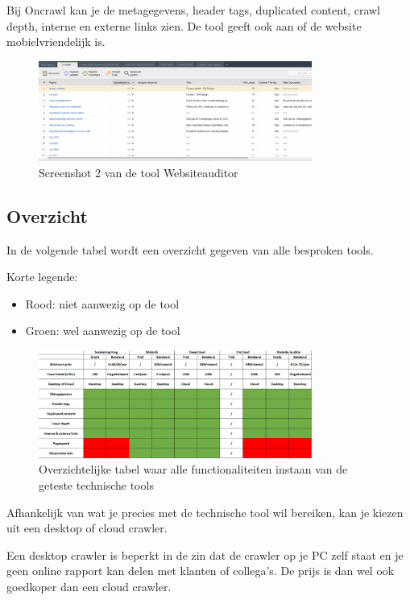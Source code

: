 Bij Oncrawl kan je de metagegevens, header tags, duplicated content, crawl depth, interne en externe links zien. De tool geeft ook aan of de website mobielvriendelijk is.

\begin{figure}[h!]
\centering
\includegraphics[width=0.8\textwidth]{img/websiteauditor1.PNG}
\caption{Screenshot 2 van de tool Websiteauditor
\autocite{websiteauditor}}
\end{figure}

\subsection{Overzicht}
\label{ch: Overzicht}

In de volgende tabel wordt een overzicht gegeven van alle besproken tools. 

Korte legende: 
\begin{itemize}
\item Rood: niet aanwezig op de tool
\item Groen: wel aanwezig op de tool
\end{itemize}

\begin{figure}[h!]
\centering
\includegraphics[width=0.8\textwidth]{img/Knipsel.PNG}
\caption{Overzichtelijke tabel waar alle functionaliteiten instaan van de geteste technische tools}
\end{figure}

Afhankelijk van wat je precies met de technische tool wil bereiken, kan je kiezen uit een desktop of cloud crawler. 

Een desktop crawler is beperkt in de zin dat de crawler op je PC zelf staat en je geen online rapport kan delen met klanten of collega's. De prijs is dan wel ook goedkoper dan een cloud crawler. 

